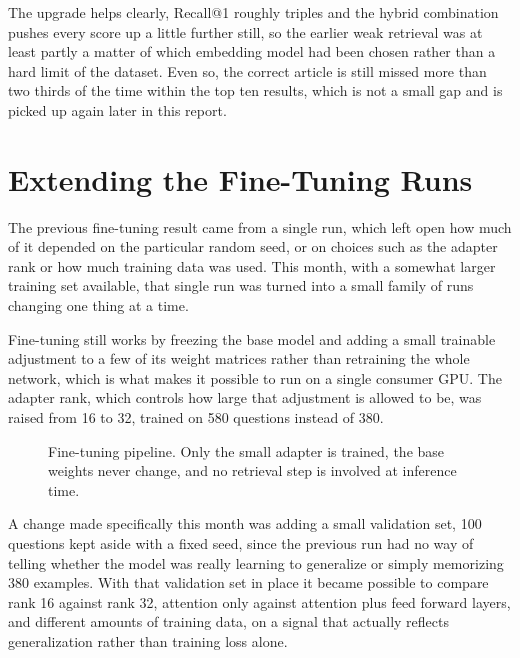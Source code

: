 \documentclass[11pt, a4paper]{article}
\begin{document}
The upgrade helps clearly, Recall@1 roughly triples and the hybrid combination pushes every score up a little further still, so the earlier weak retrieval was at least partly a matter of which embedding model had been chosen rather than a hard limit of the dataset. Even so, the correct article is still missed more than two thirds of the time within the top ten results, which is not a small gap and is picked up again later in this report.

\section{Extending the Fine-Tuning Runs}

The previous fine-tuning result came from a single run, which left open how much of it depended on the particular random seed, or on choices such as the adapter rank or how much training data was used. This month, with a somewhat larger training set available, that single run was turned into a small family of runs changing one thing at a time.

Fine-tuning still works by freezing the base model and adding a small trainable adjustment to a few of its weight matrices rather than retraining the whole network, which is what makes it possible to run on a single consumer GPU. The adapter rank, which controls how large that adjustment is allowed to be, was raised from 16 to 32, trained on 580 questions instead of 380.

\begin{figure}[H]
\centering
{}
\caption{Fine-tuning pipeline. Only the small adapter is trained, the base weights never change, and no retrieval step is involved at inference time.}
\label{fig:ftdiagram}
\end{figure}

A change made specifically this month was adding a small validation set, 100 questions kept aside with a fixed seed, since the previous run had no way of telling whether the model was really learning to generalize or simply memorizing 380 examples. With that validation set in place it became possible to compare rank 16 against rank 32, attention only against attention plus feed forward layers, and different amounts of training data, on a signal that actually reflects generalization rather than training loss alone.
\end{document}
